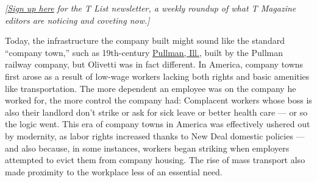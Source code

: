 \emph{{[}}\href{https://www.nytimes.com/newsletters/t-list?module=inline}{\emph{Sign
up here}} \emph{for the T List newsletter, a weekly roundup of what T
Magazine editors are noticing and coveting now.{]}}

Today, the infrastructure the company built might sound like the
standard ``company town,'' such as 19th-century
\href{https://www.nytimes.com/1990/08/12/travel/the-town-that-pullman-built.html}{Pullman,
Ill.}, built by the Pullman railway company, but Olivetti was in fact
different. In America, company towns first arose as a result of low-wage
workers lacking both rights and basic amenities like transportation. The
more dependent an employee was on the company he worked for, the more
control the company had: Complacent workers whose boss is also their
landlord don't strike or ask for sick leave or better health care --- or
so the logic went. This era of company towns in America was effectively
ushered out by modernity, as labor rights increased thanks to New Deal
domestic policies --- and also because, in some instances, workers began
striking when employers attempted to evict them from company housing.
The rise of mass transport also made proximity to the workplace less of
an essential need.

